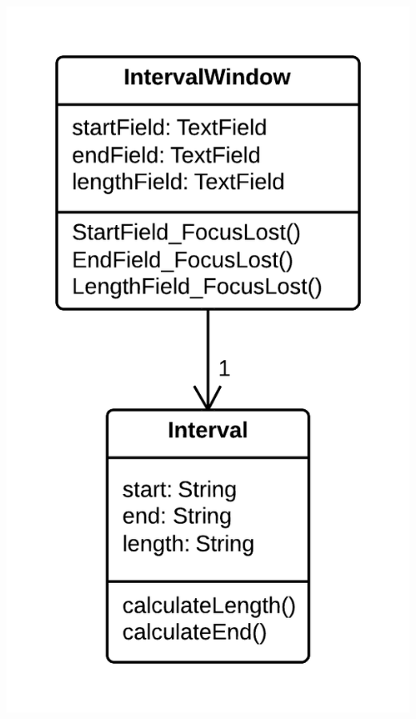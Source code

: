 \documentclass[11pt,a4paper,oneside]{book}
\begin{document}
\begin{itemize}
    \centering \includegraphics[scale=0.2]{duplicateobserveddatasolution}
\end{itemize}
    
\end{document}
